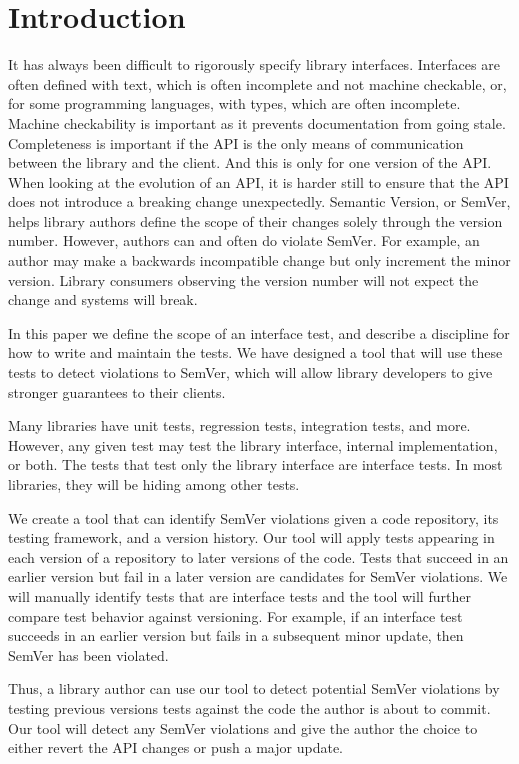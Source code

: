 \section{Introduction}

It has always been difficult to rigorously specify library interfaces.
Interfaces are often defined with text, which is often incomplete and not
machine checkable, or, for some programming languages, with types, which are
often incomplete. Machine checkability is important as it prevents
documentation from going stale. Completeness is important if the API is the
only means of communication between the library and the client. And this is
only for one version of the API. When looking at the evolution of an API, it is
harder still to ensure that the API does not introduce a breaking change
unexpectedly.  Semantic Version, or SemVer, helps library authors define the
scope of their changes solely through the version number.  However, authors can
and often do violate SemVer. For example, an author may make a backwards
incompatible change but only increment the minor version.  Library consumers
observing the version number will not expect the change and systems will break.

In this paper we define the scope of an interface test, and describe a
discipline for how to write and maintain the tests. We have designed a tool
that will use these tests to detect violations to SemVer, which will allow
library developers to give stronger guarantees to their clients. 

Many libraries have unit tests, regression tests, integration tests, and more.
However, any given test may test the library interface, internal
implementation, or both.  The tests that test only the library interface are
interface tests.  In most libraries, they will be hiding among other tests.

We create a tool that can identify SemVer violations given a code
repository, its testing framework, and a version history.  Our tool will apply
tests appearing in each version of a repository to later versions of the code.
Tests that succeed in an earlier version but fail in a later version are
candidates for SemVer violations.  We will manually identify tests that are
interface tests and the tool will further compare test behavior against
versioning.  For example, if an interface test succeeds in an earlier version
but fails in a subsequent minor update, then SemVer has been violated.  

Thus, a library author can use our tool to detect potential SemVer violations
by testing previous versions tests against the code the author is about to
commit. Our tool will detect any SemVer violations and give the author the
choice to either revert the API changes or push a major update.
